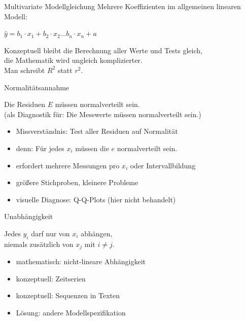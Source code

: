 \begin{frame}
  {Multivariate Modellgleichung}
  Mehrere Koeffizienten im \alert{allgemeinen linearen Modell}:\\
  \pause
  \vspace{0.5cm}
  \begin{center}
    \alert{$\hat{y}=b_1\cdot x_1+b_2\cdot x_2\dots b_n\cdot x_n+a$}
  \end{center}
  \vspace{0.5cm}
  \pause
  Konzeptuell bleibt die Berechnung aller Werte und Tests gleich,\\
  die Mathematik wird ungleich komplizierter.\\
  \vspace{0.5cm}
  \pause
  Man schreibt \alert{$R^2$} statt $r^2$.
\end{frame}

\begin{frame}
  {Normalitätsannahme}
  \begin{center}
    \alert{Die Residuen $E$ müssen normalverteilt sein.}\\
    (als Diagnostik für: \alert{Die Messwerte müssen normalverteilt sein.})
  \end{center}
  \begin{itemize}[<+->]
    \item Missverständnis: Test aller Residuen auf Normalität
    \item denn: \alert{Für jedes $x_i$ müssen die $e$ normalverteilt sein.}
    \item erfordert mehrere Messungen pro $x_i$ oder Intervallbildung 
    \item größere Stichproben, kleinere Probleme
    \item visuelle Diagnose: Q-Q-Plots (hier nicht behandelt)
  \end{itemize}
\end{frame}

\begin{frame}
  {Unabhängigkeit}
  \begin{center}
    \alert{Jedes $y_i$ darf nur von $x_i$ abhängen,\\
        niemals zusätzlich von $x_j$ mit $i\neq j$.}
  \end{center}
  \begin{itemize}[<+->]
    \item mathematisch: nicht-lineare Abhängigkeit
    \item konzeptuell: Zeitserien
    \item konzeptuell: Sequenzen in Texten
    \item Lösung: andere Modellspezifikation
  \end{itemize}
\end{frame}

